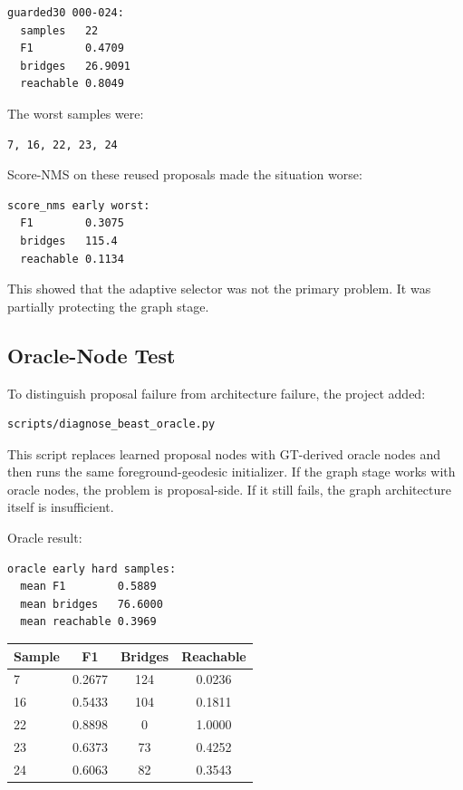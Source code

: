 \documentclass[11pt]{article}
\begin{document}
\begin{lstlisting}
guarded30 000-024:
  samples   22
  F1        0.4709
  bridges   26.9091
  reachable 0.8049
\end{lstlisting}

The worst samples were:

\begin{lstlisting}
7, 16, 22, 23, 24
\end{lstlisting}

Score-NMS on these reused proposals made the situation worse:

\begin{lstlisting}
score_nms early worst:
  F1        0.3075
  bridges   115.4
  reachable 0.1134
\end{lstlisting}

This showed that the adaptive selector was not the primary problem. It was
partially protecting the graph stage.

\subsection{Oracle-Node Test}

To distinguish proposal failure from architecture failure, the project added:

\begin{lstlisting}
scripts/diagnose_beast_oracle.py
\end{lstlisting}

This script replaces learned proposal nodes with GT-derived oracle nodes and
then runs the same foreground-geodesic initializer. If the graph stage works
with oracle nodes, the problem is proposal-side. If it still fails, the graph
architecture itself is insufficient.

Oracle result:

\begin{lstlisting}
oracle early hard samples:
  mean F1        0.5889
  mean bridges   76.6000
  mean reachable 0.3969
\end{lstlisting}

\begin{center}
\begin{tabular}{lccc}
\toprule
Sample & F1 & Bridges & Reachable \\
\midrule
7 & 0.2677 & 124 & 0.0236 \\
16 & 0.5433 & 104 & 0.1811 \\
22 & 0.8898 & 0 & 1.0000 \\
23 & 0.6373 & 73 & 0.4252 \\
24 & 0.6063 & 82 & 0.3543 \\
\bottomrule
\end{tabular}
\end{center}
\end{document}
